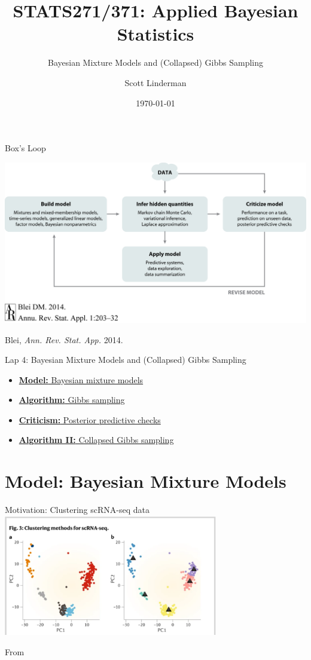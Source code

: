 \documentclass[aspectratio=169]{beamer}
\title{STATS271/371: Applied Bayesian Statistics}
\subtitle{Bayesian Mixture Models and (Collapsed) Gibbs Sampling}
\author{Scott Linderman}
\date{\today}
\begin{document}
\maketitle

\begin{frame}{Box's Loop}
\begin{center}
\includegraphics[width=.85\linewidth]{figures/lap1/boxsloop.jpeg}\\
\end{center} 
\begin{flushright}
{\footnotesize Blei, \textit{Ann. Rev. Stat. App.} 2014.}
\end{flushright}
\end{frame}

\begin{frame}{Lap 4: Bayesian Mixture Models and (Collapsed) Gibbs Sampling}
\begin{itemize}
    \item \hyperref[sec:mixtures]{\textbf{Model:} Bayesian mixture models}
    \item \hyperref[sec:gibbs]{\textbf{Algorithm:} Gibbs sampling}
    \item \hyperref[sec:ppcs]{\textbf{Criticism:} Posterior predictive checks}
    \item \hyperref[sec:collapsed_gibbs]{\textbf{Algorithm II:} Collapsed Gibbs sampling}
\end{itemize}
\end{frame}


\section{Model: Bayesian Mixture Models}
\label{sec:mixtures}

\begin{frame}{Motivation: Clustering scRNA-seq data}
\centering
\includegraphics[width=0.7\textwidth]{figures/lap4/scrnaseq.pdf}

From \citet{Kiselev2019-bt}
\end{frame}
\end{document}
